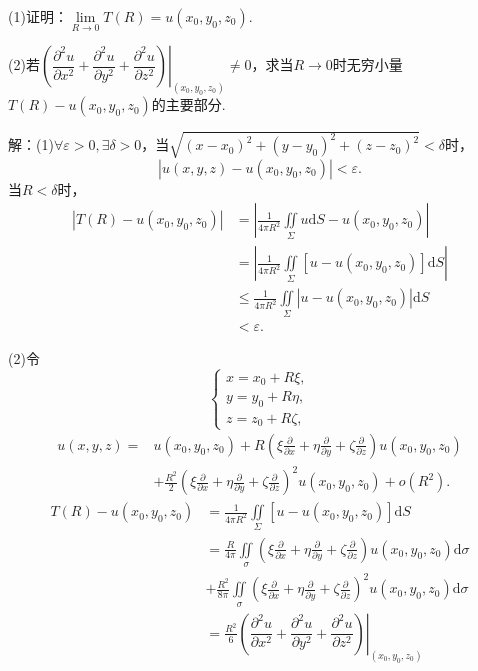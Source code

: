 \documentclass[12pt, a4paper]{article}
\newcommand{\dif}{\mathrm{d}}
\begin{document}
(1)证明：\(\lim\limits_{R \to 0} T(R) = u(x_0, y_0, z_0)\).

(2)若\(\left.\left(\dfrac{\partial^2 u}{\partial x^2} + \dfrac{\partial^2 u}{\partial y^2} + \dfrac{\partial^2 u}{\partial z^2}\right)\right|_{(x_0, y_0, z_0)} \neq 0\)，求当\(R \to 0\)时无穷小量\(T(R) - u(x_0, y_0, z_0)\)的主要部分.

解：(1)\(\forall \varepsilon > 0, \exists \delta > 0\)，当\(\sqrt{(x - x_0)^2 + (y - y_0)^2 + (z - z_0)^2} < \delta\)时，
\[|u(x, y, z) - u(x_0, y_0, z_0)| < \varepsilon.\]
当\(R < \delta\)时，
\begin{align*}
|T(R) - u(x_0, y_0, z_0)| &= \left|\frac{1}{4\pi R^2}\iint\limits_\Sigma u \dif S - u(x_0, y_0, z_0)\right| \\
&= \left|\frac{1}{4\pi R^2}\iint\limits_\Sigma [u - u(x_0, y_0, z_0)] \dif S\right| \\
&\leq \frac{1}{4\pi R^2}\iint\limits_\Sigma |u - u(x_0, y_0, z_0)| \dif S \\
&< \varepsilon.
\end{align*}

(2)令
\[\begin{cases}
x = x_0 + R\xi, \\
y = y_0 + R\eta, \\
z = z_0 + R\zeta,
\end{cases}\]
\begin{align*}
u(x, y, z) = &u(x_0, y_0, z_0) + R\left(\xi\frac{\partial}{\partial x} + \eta\frac{\partial}{\partial y} + \zeta\frac{\partial}{\partial z}\right)u(x_0, y_0, z_0) \\
&+ \frac{R^2}{2}\left(\xi\frac{\partial}{\partial x} + \eta\frac{\partial}{\partial y} + \zeta\frac{\partial}{\partial z}\right)^2u(x_0, y_0, z_0) + o(R^2).
\end{align*}
\begin{align*}
T(R) - u(x_0, y_0, z_0) &= \frac{1}{4\pi R^2}\iint\limits_\Sigma [u - u(x_0, y_0, z_0)] \dif S \\
&= \frac{R}{4\pi} \iint\limits_\sigma \left(\xi\frac{\partial}{\partial x} + \eta\frac{\partial}{\partial y} + \zeta\frac{\partial}{\partial z}\right)u(x_0, y_0, z_0) \dif \sigma \\
&+ \frac{R^2}{8\pi} \iint\limits_\sigma \left(\xi\frac{\partial}{\partial x} + \eta\frac{\partial}{\partial y} + \zeta\frac{\partial}{\partial z}\right)^2u(x_0, y_0, z_0) \dif \sigma \\
&= \frac{R^2}{6}\left.\left(\dfrac{\partial^2 u}{\partial x^2} + \dfrac{\partial^2 u}{\partial y^2} + \dfrac{\partial^2 u}{\partial z^2}\right)\right|_{(x_0, y_0, z_0)}
\end{align*}
\end{document}
